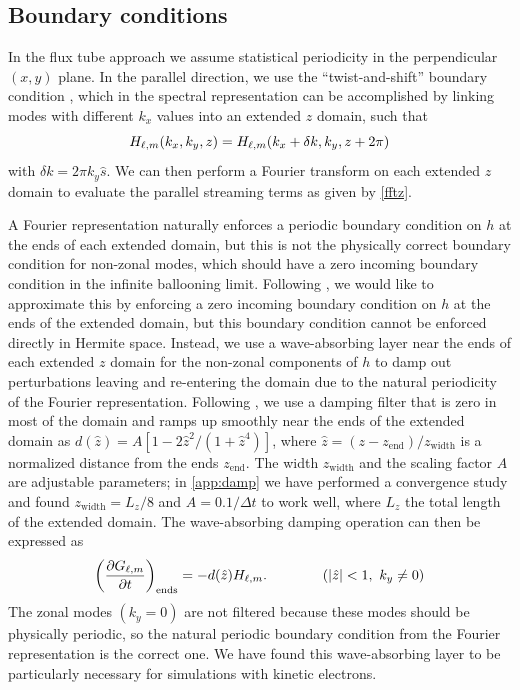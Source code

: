 \documentclass{jpp}
\begin{document}
\subsection{\color{black} Boundary conditions} \label{sec:bcs}

In the flux tube approach we assume statistical periodicity in the perpendicular $(x,y)$ plane. In the parallel direction, we use the ``twist-and-shift'' boundary condition \citep{Beer1995}, which in the spectral representation can be accomplished by linking modes with different $k_x$ values into an extended $z$ domain, such that
\begin{equation}
    {\color{black} H_{\ell,m}(k_x, k_y, z) = H_{\ell,m}(k_x+\delta k, k_y, z+2\pi)}
\end{equation}
with $\delta k = 2\pi k_y \hat{s}$. 
We can then perform a Fourier transform on each extended $z$ domain to evaluate the parallel streaming terms as given by \cref{fftz}.

A Fourier representation naturally enforces a periodic boundary condition on $h$ at the ends of each extended domain, but this is not the physically correct boundary condition for non-zonal modes, which should have a zero incoming boundary condition {\color{black} in the infinite ballooning limit. Following \citet{kotschenreuther1995}, we would like to approximate this by enforcing a zero incoming boundary condition on $h$ at the ends of the extended domain, but this boundary condition cannot be enforced directly in Hermite space. Instead, we use a wave-absorbing layer} \citep[see \emph{e.g.}][\color{black} and references within]{durran2010a} near the ends of each extended $z$ domain for the non-zonal components of $h$ to damp out perturbations {\color{black} leaving and} re-entering the domain {\color{black} due to the natural periodicity of the Fourier representation}. Following \citet{beer1995a}, we use a damping filter that is zero in most of the domain and ramps up smoothly near the ends of the extended domain as $d(\hat{z}) = A[1-2\hat{z}^2/(1+\hat{z}^4)]$, where $\hat{z} = (z-z_\mathrm{end})/z_\mathrm{width}$ is a normalized distance from the ends $z_\mathrm{end}$. The width $z_\mathrm{width}$ and the scaling factor $A$ are adjustable parameters; {\color{black} in \cref{app:damp} we have performed a convergence study and found} $z_\mathrm{width} = L_z/8$ and {\color{black} $A = 0.1/\Delta t$} to work well, where $L_z$ the total length of the extended domain. The wave-absorbing damping operation can then be expressed as
\begin{equation}
    \left(\frac{\partial G_{\ell, m}}{\partial t}\right)_\mathrm{ends} = -d(\hat{z}) H_{\ell,m}. \qquad \qquad (|\hat{z}|<1,\  k_y \neq 0)
\end{equation}
The zonal modes $(k_y=0)$ are not filtered because these modes should be physically periodic, so the natural periodic boundary condition from the Fourier representation is the correct one. {\color{black} We have found this wave-absorbing layer to be particularly necessary for simulations with kinetic electrons.}
\end{document}
